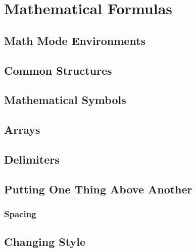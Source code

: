 \section{Mathematical Formulas}
\subsection{Math Mode Environments}


\subsection{Common Structures}


\subsection{Mathematical Symbols}


\subsection{Arrays}


\subsection{Delimiters}


\subsection{Putting One Thing Above Another}


\subsubsection{Spacing}


\subsection{Changing Style}